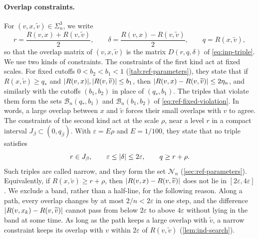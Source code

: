 \paragraph{Overlap constraints.} For $(v,x,{\widetilde v})\in\Sigma_n^3$, we write
\[
 r=\frac{R(v,x)+R(v,{\widetilde v})}2,\qquad\delta=\frac{R(v,x)-R(v,{\widetilde v})}2,\qquad q=R(x,{\widetilde v}),
\]
so that the overlap matrix of $(v,x,{\widetilde v})$ is the matrix $D(r,q,\delta)$ of
\eqref{eq:inp-triple}. We use two kinds of constraints. The constraints of the
first kind act at fixed scales. For fixed cutoffs $0<b_2<b_1<1$
(\cref{tab:ref-parameters}), they state that if $R(x,{\widetilde v})\ge q_*$ and
$\lvert R(v,x)\rvert,\lvert R(v,{\widetilde v})\rvert\le b_1$, then $\lvert R(v,x)-R(v,{\widetilde v})\rvert\le2\eta_n$, and
similarly with the cutoffs $(b_1,b_2)$ in place of $(q_*,b_1)$. The triples
that violate them form the sets $\mathcal B_n(q_*,b_1)$ and
$\mathcal B_n(b_1,b_2)$ of \eqref{eq:ref-fixed-violation}. In words, a large
overlap between $x$ and ${\widetilde v}$ forces their small overlaps with
$v$ to agree. The
constraints of the second kind act at the scale $\rho$, near a level $r$ in a
compact interval $J_\beta\subset(0,q_\beta)$. With $\varepsilon=E\rho$ and
$E=1/100$, they state that no triple satisfies
\[
 r\in J_\beta,\qquad\varepsilon\le\lvert \delta\rvert\le2\varepsilon,\qquad q\ge r+\rho.
\]
Such triples are called narrow, and they form the set $\mathcal N_n$
(\cref{sec:ref-parameters}). Equivalently, if $R(x,{\widetilde v})\ge r+\rho$, then
$\lvert R(v,x)-R(v,{\widetilde v})\rvert$ does not lie in $[2\varepsilon,4\varepsilon]$. We
exclude a band, rather than a half-line, for the following reason. Along a
path, every overlap changes by at most $2/n<2\varepsilon$ in one step, and the
difference $\lvert R(v,x_k)-R(v,{\widetilde v})\rvert$ cannot pass from below $2\varepsilon$ to
above $4\varepsilon$ without lying in the band at some time. As long as the path
keeps a large overlap with ${\widetilde v}$, a narrow constraint keeps its overlap with $v$
within $2\varepsilon$ of $R(v,{\widetilde v})$ (\cref{lem:ind-search}).

